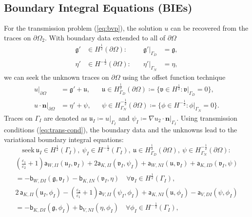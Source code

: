 \documentclass{article}
\theoremstyle{remark}
\newcommand{\aaa}{\mathsf{a}}
\newcommand{\bbb}{\mathsf{b}}
\newcommand{\n}{\boldsymbol{n}}
\newcommand{\argu}{\mathfrak{u}}
\newcommand{\argv}{\mathfrak{v}}
\newcommand{\argg}{\mathfrak{g}}
\begin{document}
\subsection{Boundary Integral Equations (BIEs)}
For the transmission problem (\ref{eq:bvp}), the solution $u$ can be recovered from the traces on $\partial\Omega_2$. With boundary data extended to all of $\partial\Omega$
\begin{equation}
\begin{aligned}
    \argg'&\in H^{\frac{1}{2}}(\partial\Omega):&\quad\argg'|_{\Gamma_D}&=\argg,\\
    \eta'&\in H^{-\frac{1}{2}}(\partial\Omega):&\quad\eta'|_{\Gamma_N}&=\eta,
\end{aligned}
\end{equation}
we can seek the unknown traces on $\partial\Omega$ using the offset function technique
\begin{equation}
\begin{aligned}
    \left.u\right|_{\partial\Omega}&=\argg'+\argu,&&\argu\in H^{\frac{1}{2}}_{\Gamma_D}(\partial\Omega)\coloneqq\{\argv\in H^{\frac{1}{2}}:\left.\argv\right|_{\Gamma_D}=0\},\\
    \left.u\cdot\n\right|_{\partial\Omega}&=\eta'+\psi,&&\psi\in H^{-\frac{1}{2}}_{\Gamma_N}(\partial\Omega)\coloneqq\{\phi\in H^{-\frac{1}{2}}:\left.\phi\right|_{\Gamma_N}=0\}.
\end{aligned}
\end{equation}
Traces on $\Gamma_I$ are denoted as
$\argu_I\coloneqq\left.u\right|_{\Gamma_I}$ and $\psi_I\coloneqq\left.\nabla u_2\cdot\n\right|_{\Gamma_I}$. Using transmission conditions (\ref{eq:trans-cond}), the boundary data and the unknowns lead to the variational boundary integral equations:
\begin{equation*}
    \text{seek}~\argu_I\in H^{\frac{1}{2}}(\Gamma_I),
    ~\psi_I\in H^{-\frac{1}{2}}(\Gamma_I),
    ~\argu\in H^{\frac{1}{2}}_{\Gamma_D}(\partial\Omega),
    ~\psi\in H^{-\frac{1}{2}}_{\Gamma_N}(\partial\Omega):
\end{equation*}
\begin{multline*}
    \left(\frac{\varepsilon_1}{\varepsilon_2}+1\right)\aaa_{W,II}(\argu_I,\argv_I)+2\aaa_{K,II}(\argv_I,\psi_I)+\aaa_{W,NI}(\argu,\argv_I)+\aaa_{K,ID}(\argv_I,\psi)\\
    =-\bbb_{W,DI}(\argg,\argv_I)-\bbb_{K,IN}(\argv_I,\eta)\quad
    \forall\argv_I\in H^{\frac{1}{2}}(\Gamma_I),
\end{multline*}
\begin{multline*}
    2\,\aaa_{K,II}(\argu_I,\phi_I)-\left(\frac{\varepsilon_2}{\varepsilon_1}+1\right)\aaa_{V,II}(\psi_I,\phi_I)+\aaa_{K,NI}(\argu,\phi_I)-\aaa_{V,DI}(\psi,\phi_I)\\
    =-\bbb_{K,DI}(\argg,\phi_I)+\bbb_{V,NI}(\eta,\phi_I)\quad
    \forall\phi_I\in H^{-\frac{1}{2}}(\Gamma_I),
\end{multline*}
\end{document}
